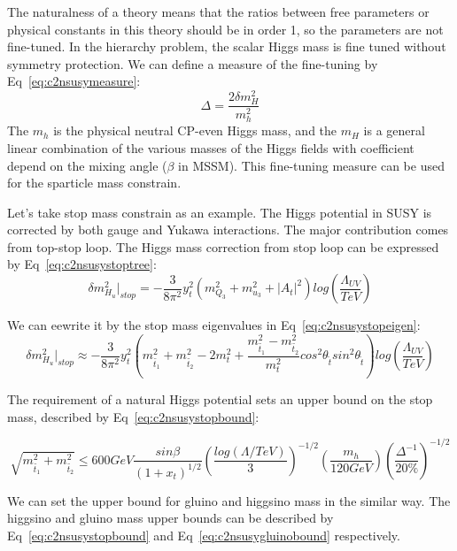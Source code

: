 The naturalness of a theory means that the ratios between free parameters or physical constants in this theory should be in order 1, so the parameters are not fine-tuned. In the hierarchy problem, the scalar Higgs mass is fine tuned without symmetry protection. We can define a measure of the fine-tuning by Eq~\ref{eq:c2nsusymeasure}:
\begin{equation}
 \Delta = \frac{2\delta m_{H}^{2}}{m_{h}^{2}}
 \label{eq:c2nsusymeasure}
\end{equation}
The $m_{h}$ is the physical neutral CP-even Higgs mass, and the $m_{H}$ is a general linear combination of the various masses of the Higgs fields with coefficient depend on the mixing angle ($\beta$ in MSSM). This fine-tuning measure can be used for the sparticle mass constrain. 

Let’s take stop mass constrain as an example. The Higgs potential in SUSY is corrected by both gauge and Yukawa interactions. The major contribution comes from top-stop loop. The Higgs mass correction from stop loop can be expressed by Eq~\ref{eq:c2nsusystoptree}: 
\begin{equation}
 \delta m_{H_{u}}^{2}|_{stop} = - \frac{3}{8\pi^{2}}y_{t}^{2}(m_{Q_{3}}^{2}+m_{u_{3}}^{2}+|A_{t}|^{2})log(\frac{\Lambda_{UV}}{TeV})
 \label{eq:c2nsusystoptree}
\end{equation}

We can eewrite it by the stop mass eigenvalues in Eq~\ref{eq:c2nsusystopeigen}:
\begin{equation}
	\delta m_{H_{u}}^{2}|_{stop} \approx - \frac{3}{8\pi^{2}}y_{t}^{2}(m_{\tilde{t_{1}}}^{2}+m_{\tilde{t_{2}}}^{2}-2m_{t}^{2}+\frac{m_{\tilde{t_{1}}}^{2}-m_{\tilde{t_{2}}}^{2}}{m_{t}^{2}}cos^{2}\theta_{\tilde{t}}sin^{2}\theta_{\tilde{t}})log(\frac{\Lambda_{UV}}{TeV})
 \label{eq:c2nsusystopeigen}
\end{equation}

The requirement of a natural Higgs potential sets an upper bound on the stop mass\cite{Papucci:2011wy}, described by Eq~\ref{eq:c2nsusystopbound}:

\begin{equation}
 \sqrt{m_{\tilde{t_{1}}}^{2}+m_{\tilde{t_{2}}}^{2}} \leq 600GeV\frac{sin\beta}{(1+x_{t})^{1/2}} (\frac{log(\Lambda/TeV)}{3})^{-1/2}(\frac{m_{h}}{120GeV})(\frac{\Delta^{-1}}{20\%})^{-1/2}
 \label{eq:c2nsusystopbound}
\end{equation}

We can set the upper bound for gluino and higgsino mass in the similar way\cite{Papucci:2011wy}. The higgsino and gluino mass upper bounds can be described by Eq~\ref{eq:c2nsusystopbound} and Eq~\ref{eq:c2nsusygluinobound} respectively.

